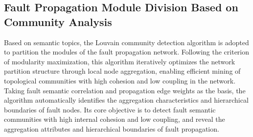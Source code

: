 \documentclass[conference]{IEEEconf}
\begin{document}
\subsection{Fault Propagation Module Division Based on Community Analysis}
Based on semantic topics, the Louvain community detection algorithm is adopted to partition the modules of the fault propagation network. Following the criterion of modularity maximization, this algorithm iteratively optimizes the network partition structure through local node aggregation, enabling efficient mining of topological communities with high cohesion and low coupling in the network. Taking fault semantic correlation and propagation edge weights as the basis, the algorithm automatically identifies the aggregation characteristics and hierarchical boundaries of fault nodes. Its core objective is to detect fault semantic communities with high internal cohesion and low coupling, and reveal the aggregation attributes and hierarchical boundaries of fault propagation\cite{zhang2012journal}.
\end{document}
